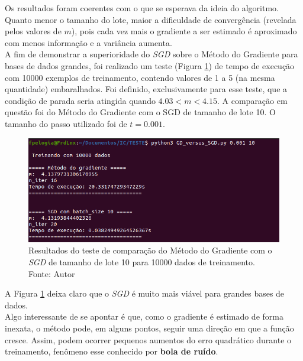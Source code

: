 \documentclass[a4paper,12pt]{article}
\begin{document}
Os resultados foram coerentes com o que se esperava da ideia do algoritmo. Quanto menor o tamanho do lote, maior a dificuldade de convergência (revelada pelos valores de $m$), pois cada vez mais o gradiente a ser estimado é aproximado com menos informação e a variância aumenta.\\

A fim de demonstrar a superioridade do \textit{SGD} sobre o Método do Gradiente para bases de dados grandes, foi realizado um teste (Figura \ref{fig:GDvsSGD}) de tempo de execução com 10000 exemplos de treinamento, contendo valores de 1 a 5 (na mesma quantidade) embaralhados. Foi definido, exclusivamente para esse teste, que a condição de parada seria atingida quando $4.03 < m < 4.15$. A comparação em questão foi do Método do Gradiente com o SGD de tamanho de lote 10. O tamanho do passo utilizado foi de $t = 0.001$.

\begin{figure}[H]
\centering 
\includegraphics[scale=0.7]{Figuras/GD_VS_SGD.png}
\caption{Resultados do teste de comparação do Método do Gradiente com o \textit{SGD} de tamanho de lote 10 para 10000 dados de treinamento. Fonte: Autor}
\label{fig:GDvsSGD}
\end{figure} 

A Figura \ref{fig:GDvsSGD} deixa claro que o \textit{SGD} é muito mais viável para grandes bases de dados. \\




Algo interessante de se apontar é que, como o gradiente é estimado de forma inexata, o método pode, em alguns pontos, seguir uma direção em que a função cresce. Assim, podem ocorrer pequenos aumentos do erro quadrático durante o treinamento, fenômeno esse conhecido por \textbf{bola de ruído}.
\end{document}
